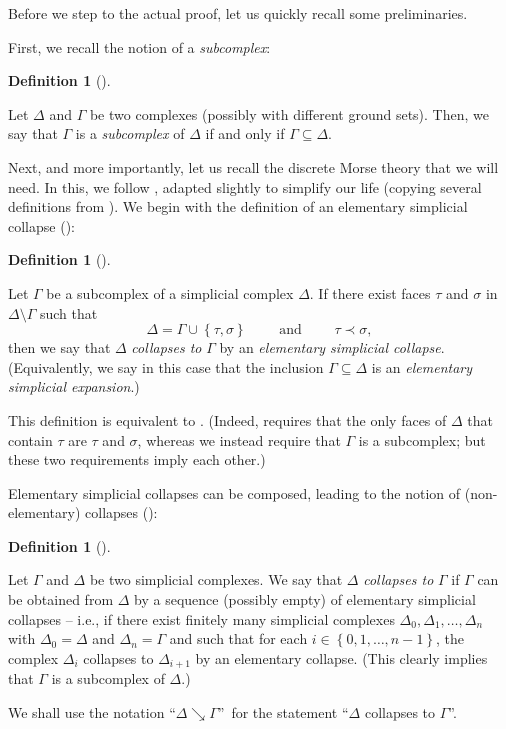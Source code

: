 \documentclass[numbers=enddot,12pt,final,onecolumn,notitlepage]{scrartcl}%
\theoremstyle{definition}
\newtheorem{defi}[theo]{Definition}
\newenvironment{definition}[1][]
{\begin{defi}[#1]\begin{leftbar}}
{\end{leftbar}\end{defi}}
\newcommand{\set}[1]{\left\{ #1 \right\}}
\begin{document}
Before we step to the actual proof, let us quickly recall some preliminaries.

First, we recall the notion of a \emph{subcomplex}:

\begin{definition}
Let $\Delta$ and $\Gamma$ be two complexes (possibly with different ground
sets). Then, we say that $\Gamma$ is a \emph{subcomplex} of $\Delta$ if and
only if $\Gamma\subseteq\Delta$.
\end{definition}

Next, and more importantly, let us recall the discrete Morse theory that we
will need. In this, we follow \cite[Chapter 10]{Kozlov20}, adapted slightly to
simplify our life (copying several definitions from \cite[\S 7]{GrKaLe21}). We
begin with the definition of
an elementary simplicial collapse %
(\cite[\S 9.1]{Kozlov20}):

\begin{definition}
  \label{def.elementary.collapse}
  Let $\Gamma$ be a subcomplex of a simplicial complex $\Delta$. If there 
  exist faces $\tau$ and $\sigma$ in $\Delta \setminus \Gamma$
  such that
  \[
  \Delta = \Gamma \cup \set{\tau, \sigma}
  \qquad \text{ and } \qquad \tau \prec \sigma ,
  \]
  then we say that $\Delta$ \emph{collapses to} $\Gamma$
  by an \emph{elementary simplicial collapse}.
  (Equivalently, we say in this case that
  the inclusion $\Gamma \subseteq \Delta$ is an
  \emph{elementary simplicial expansion}.)
\end{definition}

This definition is equivalent to \cite[Definition 9.1]{Kozlov20}.
(Indeed, \cite[Definition 9.1]{Kozlov20} requires that the
only faces of $\Delta$ that contain $\tau$ are $\tau$ and $\sigma$,
whereas we instead require that $\Gamma$ is a subcomplex;
but these two requirements imply each other.)

Elementary simplicial collapses can be composed, leading to
the notion of (non-elementary) collapses
(\cite[Definition 9.4]{Kozlov20}):

\begin{definition}
  \label{def.simple.homotopy.collapse}
  Let $\Gamma$ and $\Delta$ be two simplicial complexes.
  We say that $\Delta$ \emph{collapses to} $\Gamma$
  if $\Gamma$ can be obtained from $\Delta$ by a sequence
  (possibly empty) of elementary simplicial collapses
  -- i.e., if there exist finitely many simplicial complexes $\Delta_0, \Delta_1, \dots, \Delta_n$
  with $\Delta_0 = \Delta$ and $\Delta_n = \Gamma$ and such that
  for each $i \in \set{0, 1, \dots, n-1}$,
  the complex $\Delta_i$ collapses to $\Delta_{i+1}$ by an
  elementary collapse.
  (This clearly implies that $\Gamma$ is a subcomplex of
  $\Delta$.)
  
  We shall use the notation ``$\Delta\searrow\Gamma$''\ for
  the statement ``$\Delta$ collapses to
  $\Gamma$''.
\end{definition}
\end{document}
